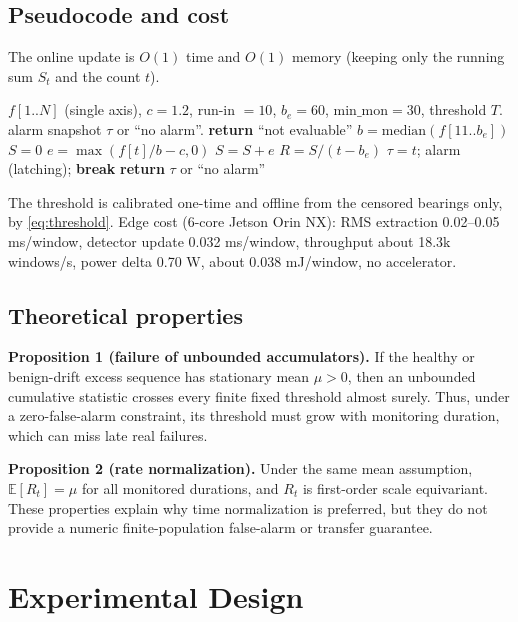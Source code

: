 \documentclass[journal]{IEEEtran}
\begin{document}
\subsection{Pseudocode and cost}
The online update is $O(1)$ time and $O(1)$ memory (keeping only the running sum $S_t$ and the count $t$).
\begin{algorithm}[!t]
\caption{Rate-normalized online early-warning detector (single axis).}
\label{alg:detector}
\begin{algorithmic}[1]
\REQUIRE $f[1..N]$ (single axis), $c=1.2$, run-in $=10$, $b_e=60$, $\mathrm{min\_mon}=30$, threshold $T$.
\ENSURE alarm snapshot $\tau$ or ``no alarm''.
 \STATE \textbf{return} ``not evaluable'' 
\ENDIF
\STATE $b=\mathrm{median}(f[11..b_e])$ 
\STATE $S=0$
 
\STATE $e=\max(f[t]/b-c,0)$
\STATE $S=S+e$
\STATE $R=S/(t-b_e)$ 
\STATE $\tau=t$; alarm (latching); \textbf{break}
\ENDIF
\ENDFOR
\STATE \textbf{return} $\tau$ or ``no alarm''
\end{algorithmic}
\end{algorithm}
The threshold is calibrated one-time and offline from the censored bearings only, by \eqref{eq:threshold}. Edge cost (6-core Jetson Orin NX): RMS extraction 0.02--0.05 ms/window, detector update 0.032 ms/window, throughput about 18.3k windows/s, power delta 0.70 W, about 0.038 mJ/window, no accelerator.


\subsection{Theoretical properties}\label{sec:theory}
\textbf{Proposition 1 (failure of unbounded accumulators).} If the healthy or benign-drift excess sequence has stationary mean $\mu>0$, then an unbounded cumulative statistic crosses every finite fixed threshold almost surely. Thus, under a zero-false-alarm constraint, its threshold must grow with monitoring duration, which can miss late real failures.

\textbf{Proposition 2 (rate normalization).} Under the same mean assumption, $\mathbb{E}[R_t]=\mu$ for all monitored durations, and $R_t$ is first-order scale equivariant. These properties explain why time normalization is preferred, but they do not provide a numeric finite-population false-alarm or transfer guarantee.

\section{Experimental Design}\label{sec:experiments}
\end{document}
